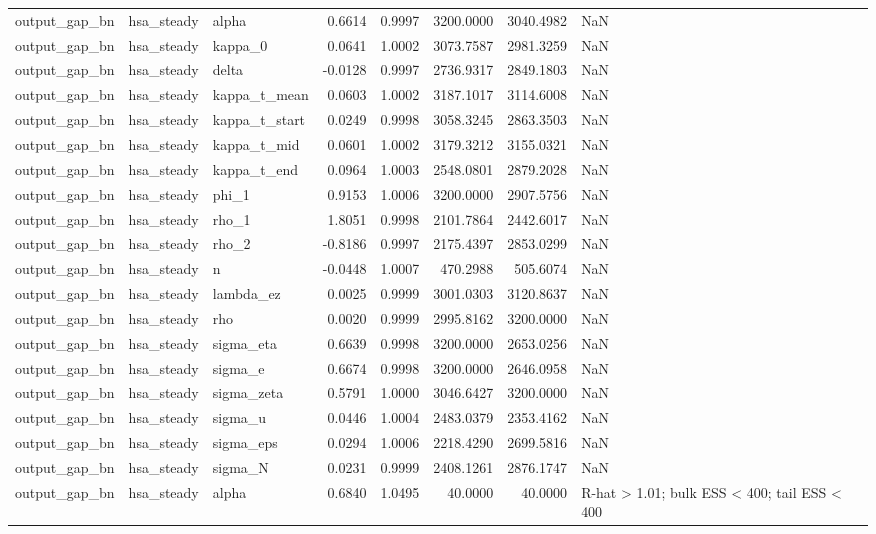 \begin{tabular}{lllrrrrl}
output\_gap\_bn & hsa\_steady & alpha & 0.6614 & 0.9997 & 3200.0000 & 3040.4982 & NaN \\
output\_gap\_bn & hsa\_steady & kappa\_0 & 0.0641 & 1.0002 & 3073.7587 & 2981.3259 & NaN \\
output\_gap\_bn & hsa\_steady & delta & -0.0128 & 0.9997 & 2736.9317 & 2849.1803 & NaN \\
output\_gap\_bn & hsa\_steady & kappa\_t\_mean & 0.0603 & 1.0002 & 3187.1017 & 3114.6008 & NaN \\
output\_gap\_bn & hsa\_steady & kappa\_t\_start & 0.0249 & 0.9998 & 3058.3245 & 2863.3503 & NaN \\
output\_gap\_bn & hsa\_steady & kappa\_t\_mid & 0.0601 & 1.0002 & 3179.3212 & 3155.0321 & NaN \\
output\_gap\_bn & hsa\_steady & kappa\_t\_end & 0.0964 & 1.0003 & 2548.0801 & 2879.2028 & NaN \\
output\_gap\_bn & hsa\_steady & phi\_1 & 0.9153 & 1.0006 & 3200.0000 & 2907.5756 & NaN \\
output\_gap\_bn & hsa\_steady & rho\_1 & 1.8051 & 0.9998 & 2101.7864 & 2442.6017 & NaN \\
output\_gap\_bn & hsa\_steady & rho\_2 & -0.8186 & 0.9997 & 2175.4397 & 2853.0299 & NaN \\
output\_gap\_bn & hsa\_steady & n & -0.0448 & 1.0007 & 470.2988 & 505.6074 & NaN \\
output\_gap\_bn & hsa\_steady & lambda\_ez & 0.0025 & 0.9999 & 3001.0303 & 3120.8637 & NaN \\
output\_gap\_bn & hsa\_steady & rho & 0.0020 & 0.9999 & 2995.8162 & 3200.0000 & NaN \\
output\_gap\_bn & hsa\_steady & sigma\_eta & 0.6639 & 0.9998 & 3200.0000 & 2653.0256 & NaN \\
output\_gap\_bn & hsa\_steady & sigma\_e & 0.6674 & 0.9998 & 3200.0000 & 2646.0958 & NaN \\
output\_gap\_bn & hsa\_steady & sigma\_zeta & 0.5791 & 1.0000 & 3046.6427 & 3200.0000 & NaN \\
output\_gap\_bn & hsa\_steady & sigma\_u & 0.0446 & 1.0004 & 2483.0379 & 2353.4162 & NaN \\
output\_gap\_bn & hsa\_steady & sigma\_eps & 0.0294 & 1.0006 & 2218.4290 & 2699.5816 & NaN \\
output\_gap\_bn & hsa\_steady & sigma\_N & 0.0231 & 0.9999 & 2408.1261 & 2876.1747 & NaN \\
output\_gap\_bn & hsa\_steady & alpha & 0.6840 & 1.0495 & 40.0000 & 40.0000 & R-hat > 1.01; bulk ESS < 400; tail ESS < 400 \\

\end{tabular}
